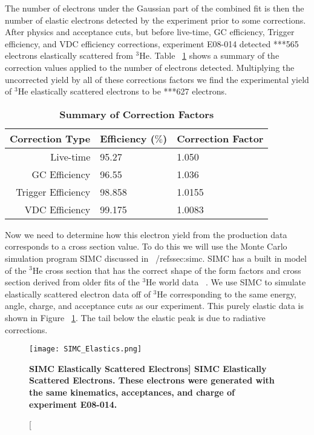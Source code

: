 The number of electrons under the Gaussian part of the combined fit is then the number of elastic electrons detected by the experiment prior to some corrections. After physics and acceptance cuts, but before live-time, GC efficiency, Trigger efficiency, and VDC efficiency corrections, experiment E08-014 detected ***565 electrons elastically scattered from $^3$He. Table ~\ref{tab:corrections} shows a summary of the correction values applied to the number of electrons detected. Multiplying the uncorrected yield by all of these corrections factors we find the experimental yield of $^3$He elastically scattered electrons to be ***627 electrons.

\begin{table}[!h]
\centering
\begin{tabular}{|r | l l|}
\hline
\textbf{Correction Type} & \textbf{Efficiency ($\%$)} & \textbf{Correction Factor}\\
\hline
Live-time & 95.27 & 1.050 \\ 
GC Efficiency & 96.55 & 1.036 \\ 
Trigger Efficiency & 98.858 & 1.0155 \\ 
VDC Efficiency & 99.175 &  1.0083\\ 
\hline
\end{tabular}
\caption{{\bf{Summary of Correction Factors}} }
\label{tab:corrections}
\end{table}

Now we need to determine how this electron yield from the production data corresponds to a cross section value. To do this we will use the Monte Carlo simulation program SIMC discussed in ~/ref{ssec:simc}. SIMC has a built in model of the $^3$He cross section that has the correct shape of the form factors and cross section derived from older fits of the $^3$He world data ~\cite{Article:Amroun}. We use SIMC to simulate elastically scattered electron data off of $^3$He corresponding to the same energy, angle, charge, and acceptance cuts as our experiment. This purely elastic data is shown in Figure ~\ref{fig:simc_elastics}. The tail below the elastic peak is due to radiative corrections.

\begin{figure}[!ht]
\begin{center}
\texttt{[image: SIMC\_Elastics.png]}
\end{center}
\caption[\bf{SIMC Elastically Scattered Electrons}]{
{\bf{SIMC Elastically Scattered Electrons.}} These electrons were generated with the same kinematics, acceptances, and charge of experiment E08-014.}
\label{fig:simc_elastics}
\end{figure}

